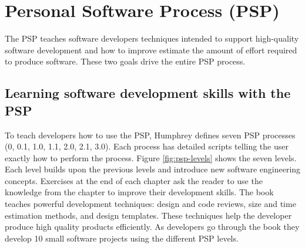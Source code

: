 \section{Personal Software Process (PSP)}

The PSP teaches software developers techniques intended to support high-quality
software development and how to improve estimate the amount of effort required
to produce software.  These two goals drive the entire PSP process.

\subsection{Learning software development skills with the PSP}

To teach developers how to use the PSP, Humphrey defines seven PSP processes
(0, 0.1, 1.0, 1.1, 2.0, 2.1, 3.0). Each process has detailed scripts telling
the user exactly how to perform the process. Figure \ref{fig:psp-levels} shows
the seven levels.  Each level builds upon the previous levels and introduce new
software engineering concepts.  Exercises at the end of each chapter ask the
reader to use the knowledge from the chapter to improve their development
skills. The book teaches powerful development techniques: design and code
reviews, size and time estimation methods, and design templates. These
techniques help the developer produce high quality products efficiently.  As
developers go through the book they develop 10 small software projects using
the different PSP levels.

